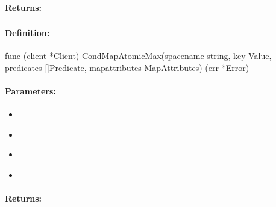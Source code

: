 \paragraph{Returns:}


\pagebreak
\subsubsection{}
\label{api:Go:CondMapAtomicMax}


\paragraph{Definition:}
\begin{gocode}
func (client *Client) CondMapAtomicMax(spacename string, key Value, predicates []Predicate, mapattributes MapAttributes) (err *Error)
\end{gocode}

\paragraph{Parameters:}
\begin{itemize}[noitemsep]
\item {}\\

\item {}\\

\item {}\\

\item {}\\

\end{itemize}

\paragraph{Returns:}


\pagebreak
\subsubsection{}
\label{api:Go:GroupMapAtomicMax}


